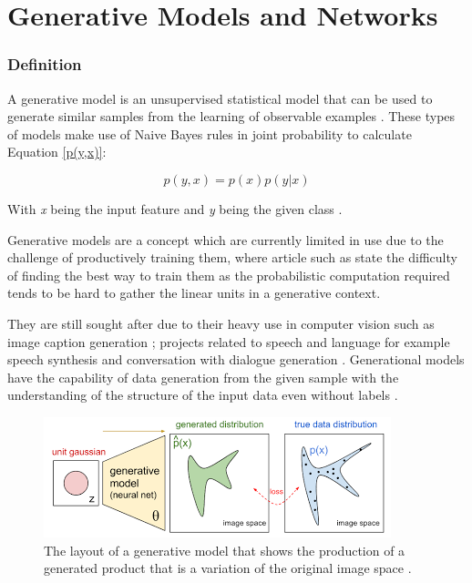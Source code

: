 \chapter{Generative Models and Networks}
\label{ch:Generative Models and Networks}

\subsection{Definition}
A generative model is an unsupervised statistical model that can be used to generate similar samples from the learning of observable examples \citep{shin:2017}.
These types of models make use of Naive Bayes rules in joint probability to calculate Equation \ref{p(y,x)}:

\begin{equation}\label{p(y,x)}
p(y,x) = p(x)p(y|x)
\end{equation}

With \textit{x} being the input feature and \textit{y} being the given class \citep{ng:2002}.

Generative models are a concept which are currently limited in use due to the challenge of productively training them, 
where article such as \citet{goodfellow:2014} state the difficulty of 
finding the best way to train them as the probabilistic computation required tends to be hard to gather the linear units in a generative context.



They are still sought after due to their heavy use in computer vision such as image caption generation \citep{lin:2014,touretzky:1996}; projects related to speech and language for example speech synthesis \citep{ou:2012} and conversation with dialogue generation \citep{sordoni:2015}. Generational models have the capability of data generation from the given sample with the understanding of the structure of the input data even without labels \citep{tu:2007}.


\begin{figure}
  \centering
  \includegraphics[width=1\linewidth]{graphics/generational_models/gm.png}

  \caption[Caption for GAN]{The layout of a generative model that shows the production of a generated product that is a variation of the original image space \protect\footnotemark.}
  \label{fig:GN}
\end{figure}
